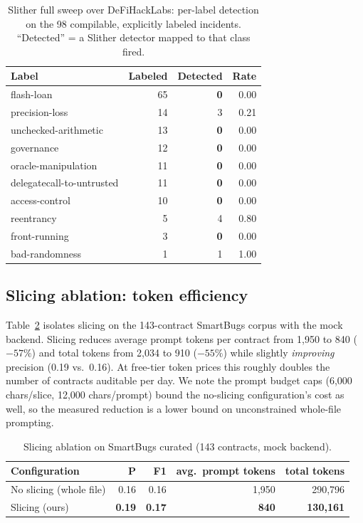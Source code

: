 \documentclass[conference]{IEEEtran}
\begin{document}
\begin{table}[t]
\centering
\caption{Slither full sweep over DeFiHackLabs: per-label detection on the 98 compilable,
explicitly labeled incidents. ``Detected'' = a Slither detector mapped to that class fired.}
\label{tab:sweep}
\begin{tabular}{lrrr}
\toprule
Label & Labeled & Detected & Rate \\
\midrule
flash-loan                  & 65 & \textbf{0} & 0.00 \\
precision-loss              & 14 & 3  & 0.21 \\
unchecked-arithmetic        & 13 & \textbf{0} & 0.00 \\
governance                  & 12 & \textbf{0} & 0.00 \\
oracle-manipulation         & 11 & \textbf{0} & 0.00 \\
delegatecall-to-untrusted   & 11 & \textbf{0} & 0.00 \\
access-control              & 10 & \textbf{0} & 0.00 \\
reentrancy                  & 5  & 4  & 0.80 \\
front-running               & 3  & \textbf{0} & 0.00 \\
bad-randomness              & 1  & 1  & 1.00 \\
\bottomrule
\end{tabular}
\end{table}

\subsection{Slicing ablation: token efficiency}
Table~\ref{tab:ablation} isolates slicing on the 143-contract SmartBugs corpus with the mock
backend. Slicing reduces average prompt tokens per contract from 1{,}950 to 840
($-57\%$) and total tokens from 2{,}034 to 910 ($-55\%$) while slightly \emph{improving} precision
(0.19 vs.\ 0.16). At free-tier token prices this roughly doubles the number of contracts auditable
per day. We note the prompt budget caps (6{,}000 chars/slice, 12{,}000 chars/prompt) bound the
no-slicing configuration's cost as well, so the measured reduction is a lower bound on unconstrained
whole-file prompting.

\begin{table}[t]
\centering
\caption{Slicing ablation on SmartBugs curated (143 contracts, mock backend).}
\label{tab:ablation}
\begin{tabular}{lrrrr}
\toprule
Configuration & P & F1 & avg.\ prompt tokens & total tokens \\
\midrule
No slicing (whole file) & 0.16 & 0.16 & 1{,}950 & 290{,}796 \\
Slicing (ours)          & \textbf{0.19} & \textbf{0.17} & \textbf{840} & \textbf{130{,}161} \\
\bottomrule
\end{tabular}
\end{table}
\end{document}
